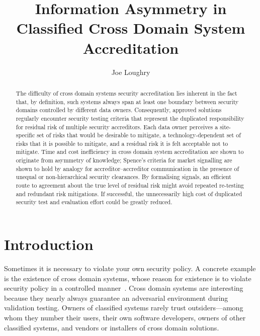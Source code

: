 \documentclass{llncs}
\begin{document}
\title{Information Asymmetry in Classified Cross Domain System Accreditation}
\author{Joe Loughry}

\maketitle

\begin{abstract}
The difficulty of cross domain systems security accreditation lies
inherent in the fact that, by definition, such systems always span at least
one boundary between security domains controlled by different data
owners. Consequently, approved solutions regularly encounter security
testing criteria that represent the duplicated responsibility for
residual risk of multiple security accreditors.  Each data owner perceives a
site-specific set of risks that would be desirable to mitigate,
a technology-dependent set of risks that it is possible to mitigate,
and a residual risk it is
felt acceptable not to mitigate.  Time and cost inefficiency in cross
domain system accreditation are shown to originate from asymmetry
of knowledge; Spence's criteria for market signalling are
shown to hold by analogy for accreditor--accreditor communication in the
presence of unequal or non-hierarchical security clearances.
By formalising signals, an efficient route to agreement about the true
level of residual risk might avoid repeated re-testing and redundant
risk mitigations.  If successful, the unnecessarily high cost of duplicated
security test and evaluation effort could be greatly reduced.
\end{abstract}


\section{Introduction}

Sometimes it is necessary to violate your own security policy.  A concrete example
is the existence of cross domain systems,
whose reason for existence is to violate security policy in a controlled
manner~\cite{DCID-6/3a}.
Cross domain systems are interesting because they nearly always guarantee an adversarial
environment during validation testing.  Owners of classified
systems rarely trust outsiders---among whom
they number their users, their own software developers, owners of other
classified systems, and vendors or installers of cross domain solutions.
\end{document}
